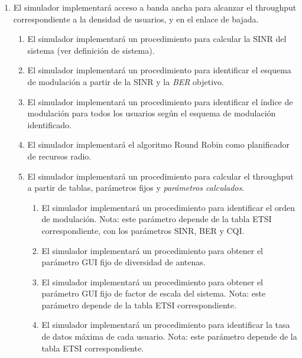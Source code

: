 \begin{enumerate}
            \item El simulador implementará acceso a banda ancha para alcanzar el throughput correspondiente a la densidad de usuarios, y en el enlace de bajada.
                    \begin{enumerate}
                        \item El simulador implementará un procedimiento para calcular la SINR del sistema (ver definición de sistema).
                        \item El simulador implementará un procedimiento para identificar el esquema de modulación a partir de la SINR y la \textit{BER} objetivo. 
                        \item El simulador implementará un procedimiento para identificar el índice de modulación para todos los usuarios según el esquema de modulación identificado.
                        \item El simulador implementará el algoritmo Round Robin como planificador de recursos radio.
                        \item El simulador implementará un procedimiento para calcular el throughput a partir de tablas, parámetros fijos y \textit{parámetros calculados}. 
                            \begin{enumerate}
                                \item El simulador implementará un procedimiento para identificar el orden de modulación. Nota: este parámetro depende de la tabla ETSI correspondiente, con los parámetros SINR, BER y CQI.
                                \item El simulador implementará un procedimiento para obtener el parámetro GUI fijo de diversidad de antenas.
                                \item El simulador implementará un procedimiento para obtener el parámetro GUI fijo de factor de escala del sistema. Nota: este parámetro depende de la tabla ETSI correspondiente.
                                
                                \item El simulador implementará un procedimiento para identificar la tasa de datos máxima de cada usuario. Nota: este parámetro depende de la tabla ETSI correspondiente.
                                

\end{enumerate}
\end{enumerate}
\end{enumerate}
